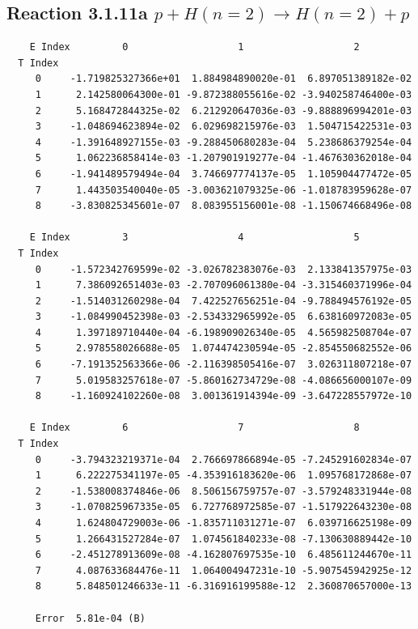 \documentclass[12pt,dvipdfmx]{article}
\begin{document}
\newpage
\subsection{
Reaction 3.1.11a $ p + H(n=2) \rightarrow H(n=2) + p$}


\begin{small}\begin{verbatim}
    E Index         0                   1                   2
  T Index
     0     -1.719825327366e+01  1.884984890020e-01  6.897051389182e-02
     1      2.142580064300e-01 -9.872388055616e-02 -3.940258746400e-03
     2      5.168472844325e-02  6.212920647036e-03 -9.888896994201e-03
     3     -1.048694623894e-02  6.029698215976e-03  1.504715422531e-03
     4     -1.391648927155e-03 -9.288450680283e-04  5.238686379254e-04
     5      1.062236858414e-03 -1.207901919277e-04 -1.467630362018e-04
     6     -1.941489579494e-04  3.746697774137e-05  1.105904477472e-05
     7      1.443503540040e-05 -3.003621079325e-06 -1.018783959628e-07
     8     -3.830825345601e-07  8.083955156001e-08 -1.150674668496e-08

    E Index         3                   4                   5
  T Index
     0     -1.572342769599e-02 -3.026782383076e-03  2.133841357975e-03
     1      7.386092651403e-03 -2.707096061380e-04 -3.315460371996e-04
     2     -1.514031260298e-04  7.422527656251e-04 -9.788494576192e-05
     3     -1.084990452398e-03 -2.534332965992e-05  6.638160972083e-05
     4      1.397189710440e-04 -6.198909026340e-05  4.565982508704e-07
     5      2.978558026688e-05  1.074474230594e-05 -2.854550682552e-06
     6     -7.191352563366e-06 -2.116398505416e-07  3.026311807218e-07
     7      5.019583257618e-07 -5.860162734729e-08 -4.086656000107e-09
     8     -1.160924102260e-08  3.001361914394e-09 -3.647228557972e-10

    E Index         6                   7                   8
  T Index
     0     -3.794323219371e-04  2.766697866894e-05 -7.245291602834e-07
     1      6.222275341197e-05 -4.353916183620e-06  1.095768172868e-07
     2     -1.538008374846e-06  8.506156759757e-07 -3.579248331944e-08
     3     -1.070825967335e-05  6.727768972585e-07 -1.517922643230e-08
     4      1.624804729003e-06 -1.835711031271e-07  6.039716625198e-09
     5      1.266431527284e-07  1.074561840233e-08 -7.130630889442e-10
     6     -2.451278913609e-08 -4.162807697535e-10  6.485611244670e-11
     7      4.087633684476e-11  1.064004947231e-10 -5.907545942925e-12
     8      5.848501246633e-11 -6.316916199588e-12  2.360870657000e-13

     Error  5.81e-04 (B)
\end{verbatim}\end{small}
\end{document}
